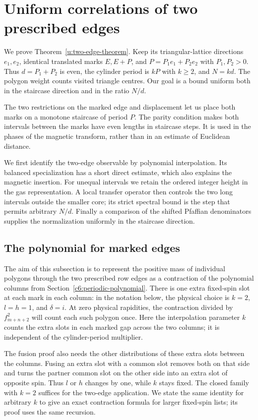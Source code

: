 \section{Uniform correlations of two prescribed edges}\label{c6:subheading-14}
\label{u:marked-uniform}

We prove Theorem~\ref{u:two-edge-theorem}.  Keep its triangular-lattice
directions $e_1,e_2$, identical translated marks $E,E+P$, and
$P=P_1e_1+P_2e_2$ with $P_1,P_2>0$.  Thus $d=P_1+P_2$ is even,
the cylinder period is $kP$ with $k\ge2$, and $N=kd$.  The polygon
weight counts visited triangle centres.  Our goal is a bound uniform
both in the staircase direction and in the ratio $N/d$.

The two restrictions on the marked edge and displacement let us place
both marks on a monotone staircase of period $P$.  The parity condition
makes both intervals between the marks have even lengths in staircase steps.
It is used in the phases of the magnetic transform, rather than in an
estimate of Euclidean distance.

We first identify the two-edge observable by polynomial interpolation.
Its balanced specialization has a short direct estimate, which also
explains the magnetic insertion.  For unequal intervals we retain the
ordered integer height in the gas representation.  A local transfer
operator then controls the two long intervals outside the smaller core;
its strict spectral bound is the step that permits arbitrary $N/d$.
Finally a comparison of the shifted Pfaffian denominators supplies the
normalization uniformly in the staircase direction.

\subsection{The polynomial for marked edges}\label{c6:magnetic}

The aim of this subsection is to represent the positive mass of individual
polygons through the two prescribed row edges as a contraction of the
polynomial columns from Section~\ref{c6:periodic-polynomial}.  There is one
extra fixed-spin slot at each mark in each column: in the notation below,
the physical choice is $k=2$, $l=h=1$, and $\delta=i$.  At zero physical
rapidities, the contraction divided by $f_{m+n+2}^2$ will count each such
polygon once.  Here the interpolation parameter $k$ counts the extra
slots in each marked gap across the two columns; it is independent of
the cylinder-period multiplier.

The fusion proof also needs the other distributions of these extra slots
between the columns.  Fusing an extra slot with a common slot removes
both on that side and turns the partner common slot on the other side
into an extra slot of opposite spin.  Thus $l$ or $h$ changes by one,
while $k$ stays fixed.  The closed family with $k=2$ suffices for the
two-edge application.  We state the same identity for arbitrary $k$ to
give an exact contraction formula for larger fixed-spin lists; its proof
uses the same recursion.

